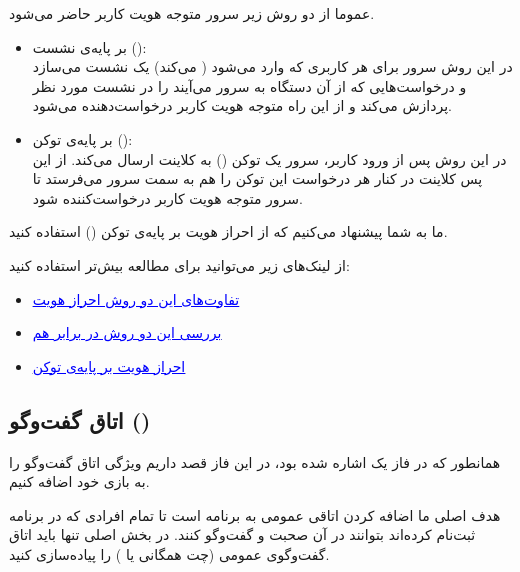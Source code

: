 \documentclass[]{article}
\begin{document}
عموما از دو روش زیر سرور متوجه هویت کاربر حاضر می‌شود.

\begin{itemize}
    \item بر پایه‌ی نشست (): \\
    در این روش سرور برای هر کاربری که وارد می‌شود ( می‌کند) یک نشست می‌سازد و درخواست‌هایی که از آن دستگاه به سرور می‌آیند را در نشست مورد نظر پردازش می‌کند و از این راه متوجه هویت کاربر درخواست‌دهنده می‌شود.
    \item بر پایه‌ی توکن (): \\
    در این روش پس از ورود کاربر، سرور یک توکن () به کلاینت ارسال می‌کند. از این پس کلاینت در کنار هر درخواست این توکن را هم به سمت سرور می‌فرستد تا سرور متوجه هویت کاربر درخواست‌کننده شود.
\end{itemize}

ما به شما پیشنهاد می‌کنیم که از احراز هویت بر پایه‌ی توکن () استفاده کنید.

از لینک‌های زیر می‌توانید برای مطالعه بیش‌تر استفاده کنید:

\begin{itemize}
    \item \href{https://dev.to/thecodearcher/what-really-is-the-difference-between-session-and-token-based-authentication-2o39}{\textcolor{blue}{\underline{تفاوت‌های این دو روش احراز هویت}}}
    \item \href{https://sherryhsu.medium.com/session-vs-token-based-authentication-11a6c5ac45e4}{\textcolor{blue}{\underline{بررسی این دو روش در برابر هم}}}
    \item \href{https://www.okta.com/identity-101/what-is-token-based-authentication/}{\textcolor{blue}{\underline{احراز هویت بر پایه‌ی توکن}}}
\end{itemize}

\subsection*{{\titr اتاق گفت‌وگو ()}}

همانطور که در فاز یک اشاره شده بود، در این فاز قصد داریم ویژگی اتاق گفت‌وگو را به بازی خود اضافه کنیم.

هدف اصلی ما اضافه کردن اتاقی عمومی به برنامه است تا تمام افرادی که در برنامه ثبت‌نام کرده‌اند بتوانند در آن صحبت و گفت‌وگو کنند. در بخش اصلی تنها باید
اتاق گفت‌وگوی عمومی (چت همگانی یا )
را پیاده‌سازی کنید.
\\
\end{document}
